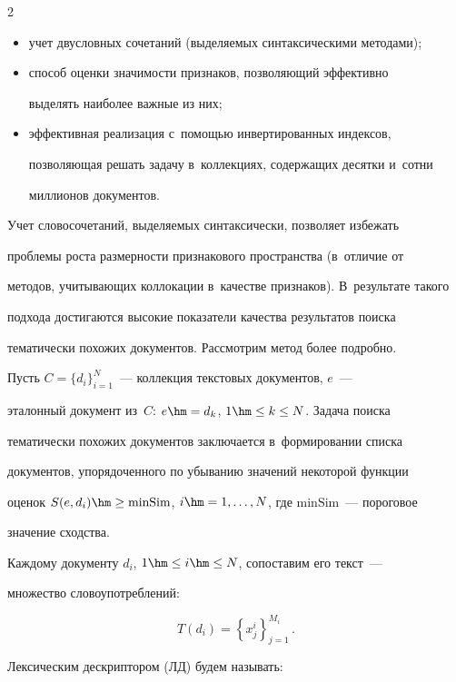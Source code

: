 \begin{multicols}{2}
\begin{itemize}
\item учет двусловных сочетаний (выделяемых синтаксическими методами);

\item способ оценки значимости признаков, позволяющий эффективно 

выделять наиболее важные из них;

\item эффективная реализация с~помощью инвертированных индексов, 

позволяющая решать задачу в~коллекциях, содержащих десятки и~сотни 

миллионов документов.

\end{itemize}

  

  Учет словосочетаний, выделяемых синтаксически, позволяет избежать 

проблемы роста раз\-мер\-ности признакового пространства (в~отличие от 

мето\-дов, учитывающих коллокации в~качестве признаков). В~результате такого 

подхода достигаются высокие показатели качества результатов поиска 

тематически похожих документов. Рас\-смот\-рим метод более подробно.

  

  Пусть $C=\{d_i\}^N_{i=1}$~--- коллекция текстовых документов, $e$~--- 

эталонный документ из~$C$: $e\hm=d_k$, $1\hm\leq k\leq N$. Задача поиска 

тематически похожих документов заключается в~формировании списка 

документов, упорядоченного по убыванию значений некоторой функции 

оценок $S(e,d_i)\hm\geq \mathrm{minSim}$, $i\hm=1,\ldots, N$, где $\mathrm{minSim}$~--- пороговое 

значение сходства.

  

  Каждому документу $d_i$, $1\hm\leq i\hm\leq N$, сопоставим его текст~--- 

множество словоупотреблений:

$$

T\left(d_i\right)= \left\{x_j^i\right\}_{j=1}^{M_i}\,.

$$



Лексическим дескриптором (ЛД) будем называть:


\end{multicols}
